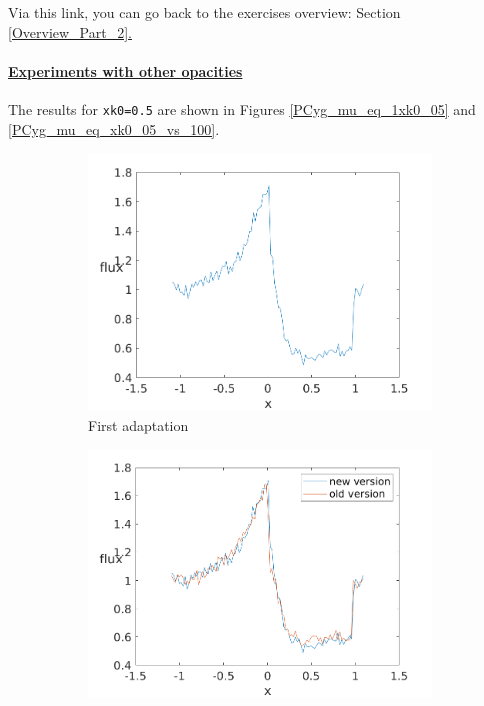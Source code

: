 \documentclass[../main/main.tex]{subfiles}
\begin{document}
\noindent{}
  
\vspace{1cm}
Via this link, you can go back to the exercises overview: Section \underline{\ref{Overview_Part_2}.}

\newpage
\paragraph{\underline{Experiments with other opacities}}
The results for \texttt{xk0=0.5} are shown in Figures \ref{PCyg_mu_eq_1xk0_05} and \ref{PCyg_mu_eq_xk0_05_vs_100}.


\begin{figure}[!htbp]
\centering
\begin{subfigure}{.5\textwidth}
\includegraphics[width=1\textwidth]{../../introductory_exercises/P_Cygni_profile_UV_resonance/data/npot5xk05alpha0beta1test1.png}
\caption{First adaptation}
\end{subfigure}%
\begin{subfigure}{.5\textwidth}
\includegraphics[width=1\textwidth]{../../introductory_exercises/P_Cygni_profile_UV_resonance/data/npot5xk05alpha0beta1test10.png}

\end{subfigure}
\end{figure}
\end{document}
